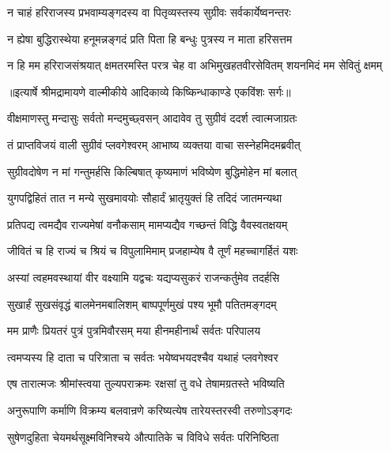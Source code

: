 \twolineshloka
{न चाहं हरिराजस्य प्रभवाम्यङ्गदस्य वा}
{पितृव्यस्तस्य सुग्रीवः सर्वकार्येष्वनन्तरः} %

\twolineshloka
{न ह्येषा बुद्धिरास्थेया हनूमन्नङ्गदं प्रति}
{पिता हि बन्धुः पुत्रस्य न माता हरिसत्तम} %

\fourlineindentedshloka
{न हि मम हरिराजसंश्रयात्}
{क्षमतरमस्ति परत्र चेह वा}
{अभिमुखहतवीरसेवितम्}
{शयनमिदं मम सेवितुं क्षमम्} %


{॥इत्यार्षे श्रीमद्रामायणे वाल्मीकीये आदिकाव्ये किष्किन्धाकाण्डे एकविंशः सर्गः॥}


\twolineshloka
{वीक्षमाणस्तु मन्दासुः सर्वतो मन्दमुच्छ्वसन्}
{आदावेव तु सुग्रीवं ददर्श त्वात्मजाग्रतः} %

\twolineshloka
{तं प्राप्तविजयं वाली सुग्रीवं प्लवगेश्वरम्}
{आभाष्य व्यक्तया वाचा सस्नेहमिदमब्रवीत्} %

\twolineshloka
{सुग्रीवदोषेण न मां गन्तुमर्हसि किल्बिषात्}
{कृष्यमाणं भविष्येण बुद्धिमोहेन मां बलात्} %

\twolineshloka
{युगपद्विहितं तात न मन्ये सुखमावयोः}
{सौहार्दं भ्रातृयुक्तं हि तदिदं जातमन्यथा} %

\twolineshloka
{प्रतिपद्य त्वमद्यैव राज्यमेषां वनौकसाम्}
{मामप्यद्यैव गच्छन्तं विद्धि वैवस्वतक्षयम्} %

\twolineshloka
{जीवितं च हि राज्यं च श्रियं च विपुलामिमाम्}
{प्रजहाम्येष वै तूर्णं महच्चागर्हितं यशः} %

\twolineshloka
{अस्यां त्वहमवस्थायां वीर वक्ष्यामि यद्वचः}
{यद्यप्यसुकरं राजन्कर्तुमेव तदर्हसि} %

\twolineshloka
{सुखार्हं सुखसंवृद्धं बालमेनमबालिशम्}
{बाष्पपूर्णमुखं पश्य भूमौ पतितमङ्गदम्} %

\twolineshloka
{मम प्राणैः प्रियतरं पुत्रं पुत्रमिवौरसम्}
{मया हीनमहीनार्थं सर्वतः परिपालय} %

\twolineshloka
{त्वमप्यस्य हि दाता च परित्राता च सर्वतः}
{भयेष्वभयदश्चैव यथाहं प्लवगेश्वर} %

\twolineshloka
{एष तारात्मजः श्रीमांस्त्वया तुल्यपराक्रमः}
{रक्षसां तु वधे तेषामग्रतस्ते भविष्यति} %

\twolineshloka
{अनुरूपाणि कर्माणि विक्रम्य बलवान्रणे}
{करिष्यत्येष तारेयस्तरस्वी तरुणोऽङ्गदः} %

\twolineshloka
{सुषेणदुहिता चेयमर्थसूक्ष्मविनिश्चये}
{औत्पातिके च विविधे सर्वतः परिनिष्ठिता} %

